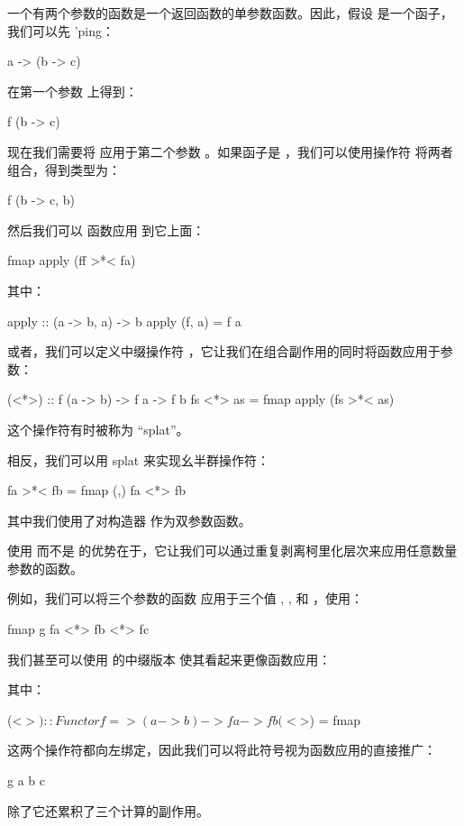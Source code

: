 \documentclass[DaoFP]{subfiles}
\begin{document}
一个有两个参数的函数是一个返回函数的单参数函数。因此，假设  是一个函子，我们可以先 'ping：
\begin{haskell}
a -> (b -> c)
\end{haskell}
在第一个参数  上得到：
\begin{haskell}
f (b -> c)
\end{haskell}
现在我们需要将  应用于第二个参数 。如果函子是 ，我们可以使用操作符 \hask{>*< } 将两者组合，得到类型为：
\begin{haskell}
f (b -> c, b)
\end{haskell}
然后我们可以  函数应用  到它上面：
\begin{haskell}
fmap apply (ff >*< fa)
\end{haskell}
其中：
\begin{haskell}
apply :: (a -> b, a) -> b
apply (f, a) = f a
\end{haskell}

或者，我们可以定义中缀操作符 \hask{<*>}，它让我们在组合副作用的同时将函数应用于参数：
\begin{haskell}
(<*>) :: f (a -> b) -> f a -> f b
fs <*> as = fmap apply (fs >*< as)
\end{haskell}
这个操作符有时被称为 \index{\hask{<*>}}``splat''。

相反，我们可以用 splat 来实现幺半群操作符：
\begin{haskell}
fa >*< fb = fmap (,) fa <*> fb
\end{haskell}
其中我们使用了对构造器 \hask{(,)} 作为双参数函数。

使用 \hask{<*>} 而不是 \hask{>*<} 的优势在于，它让我们可以通过重复剥离柯里化层次来应用任意数量参数的函数。

例如，我们可以将三个参数的函数  应用于三个值 , , 和 ，使用：
\begin{haskell}
fmap g fa <*> fb <*> fc
\end{haskell}
我们甚至可以使用  的中缀版本 \index{\hask{<$>}}\hask{<$>} 使其看起来更像函数应用：
其中：
\begin{haskell}
(<$>) :: Functor f => (a -> b) -> f a -> f b
(<$>) = fmap
\end{haskell}
这两个操作符都向左绑定，因此我们可以将此符号视为函数应用的直接推广：
\begin{haskell}
g a b c
\end{haskell}
除了它还累积了三个计算的副作用。
\end{document}
